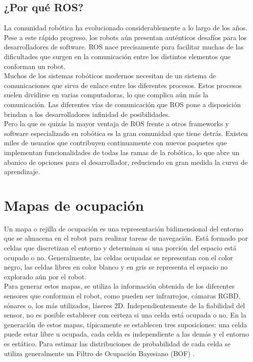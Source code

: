 \subsection{¿Por qué ROS?}

La comunidad robótica ha evolucionado considerablemente a lo largo de los años. Pese a  este rápido progreso, los robots aún presentan auténticos desafíos para los desarrolladores de software. ROS nace precisamente para facilitar muchas de las dificultades que surgen en la comunicación entre los distintos elementos que conforman un robot.\\

Muchos de los sistemas robóticos modernos necesitan de un sistema de comunicaciones que sirva de enlace entre los diferentes procesos. Estos procesos suelen dividirse en varias computadoras, lo que complica aún más la comunicación. Las diferentes vías de comunicación que ROS pone a disposición brindan a los desarrolladores infinidad de posibilidades.\\

Pero la que es quizás la mayor ventaja de ROS frente a otros frameworks y software especializado en robótica es la gran comunidad que tiene detrás. Existen miles de usuarios que contribuyen continuamente con nuevos paquetes que implementan funcionalidades de todas las ramas de la robótica, lo que abre un abanico de opciones para el desarrollador, reduciendo en gran medida la curva de aprendizaje.\\

\section{Mapas de ocupación}

Un mapa o rejilla de ocupación es una representación bidimensional del entorno que se almacena en el robot para realizar tareas de navegación. Está formado por celdas que discretizan el entorno y determinan si una porción del espacio está ocupado o no. Generalmente, las celdas ocupadas se representan con el color negro, las celdas libres en color blanco y en gris se representa el espacio no explorado aún por el robot.\\

Para generar estos mapas, se utiliza la información obtenida de los diferentes sensores que conforman el robot, como pueden ser infrarrojos, cámaras RGBD, sónares o, los más utilizados, láseres 2D. Independientemente de la fiabilidad del sensor, no es posible establecer con certeza si una celda está ocupada o no. En la generación de estos mapas, típicamente se establecen tres suposiciones: una celda puede estar libre u ocupada, cada celda es independiente a las demás y el entorno es estático. Para estimar las distribuciones de probabilidad de cada celda se utiliza generalmente un Filtro de Ocupación Bayesiano (BOF) \cite{occupancy_grid}.\\

